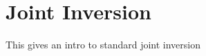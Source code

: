 \chapter{Joint Inversion}\label{Chp:cook:joint inversion}
This gives an intro to standard joint inversion